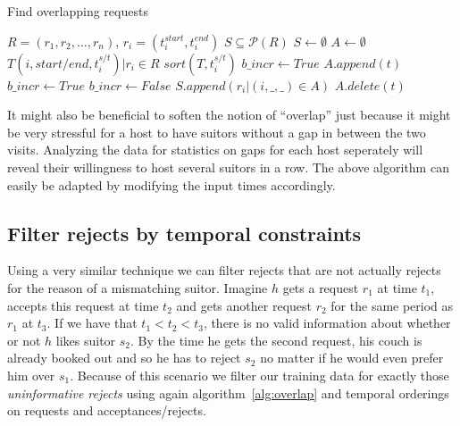 \documentclass[11pt]{article}
\begin{document}
\begin{algorithm}
\caption{Find overlapping requests}
\label{alg:overlap}
\begin{algorithmic} 
\REQUIRE $R = (r_1, r_2,\ldots,r_n)$, $r_i = (t_i^{start}, t_i^{end})$
\ENSURE $S\subseteq \mathcal{P}(R)$ 
\STATE $S \leftarrow \emptyset$
\STATE $A \leftarrow \emptyset$ 
\STATE $T {(i, start/end, t_i^{s/t}) |r_i \in R}$
\STATE $sort(T, t_i^{s/t})$ 
\STATE $b\_incr \leftarrow True$ 
\STATE $A.append(t)$
\STATE $b\_incr \leftarrow True$
\ELSE
{}
\STATE $b\_incr \leftarrow False$
\STATE $S.append({r_i | (i, \_, \_) \in A})$
\ENDIF
\STATE $A.delete(t)$
\ENDIF
\ENDFOR
\end{algorithmic}
\end{algorithm}

It might also be beneficial to soften the notion of ``overlap'' just because it might be very stressful for a host to have suitors without a gap in between the two visits. Analyzing the data for statistics on gaps for each host seperately will reveal their willingness to host several suitors in a row. The above algorithm can easily be adapted by modifying the input times accordingly.

\subsection{Filter rejects by temporal constraints}
Using a very similar technique we can filter rejects that are not actually rejects for the reason of a mismatching suitor. Imagine $h$ gets a request $r_1$ at time $t_1$, accepts this request at time $t_2$ and gets another request $r_2$ for the same period as $r_1$ at $t_3$. If we have that $t_1 < t_2 < t_3$, there is no valid information about whether or not $h$ likes suitor $s_2$. By the time he gets the second request, his couch is already booked out and so he has to reject $s_2$ no matter if he would even prefer him over $s_1$. Because of this scenario we filter our training data for exactly those \textit{uninformative rejects} using again algorithm~\ref{alg:overlap} and temporal orderings on requests and acceptances/rejects.
\end{document}
